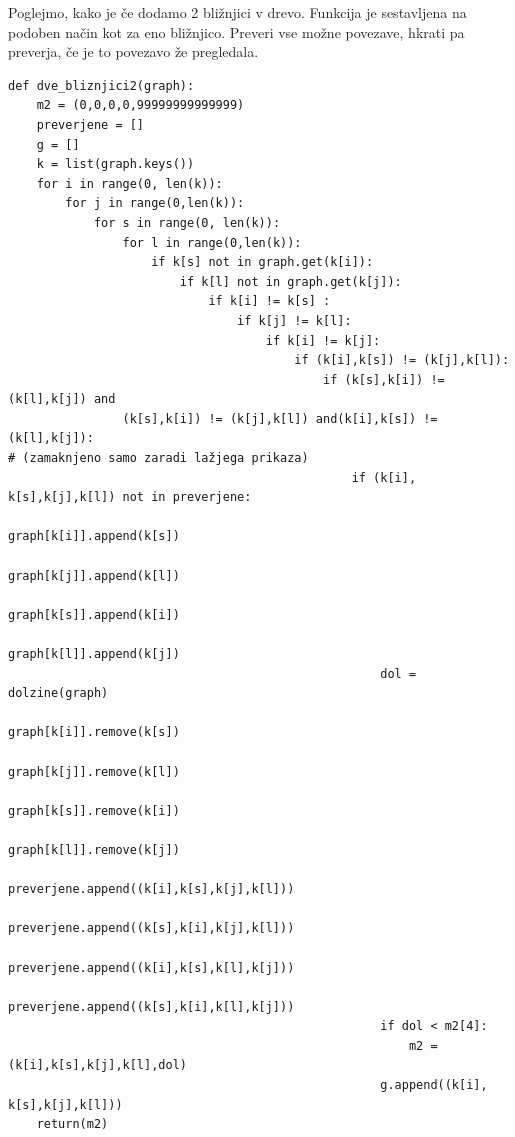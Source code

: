 \documentclass[a4paper,10pt]{article}
\begin{document}
Poglejmo, kako je če dodamo 2 bližnjici v drevo. Funkcija je sestavljena na podoben način kot za eno bližnjico. Preveri vse možne povezave, hkrati pa preverja, če je to povezavo že pregledala. 
\small
\begin{verbatim}
def dve_bliznjici2(graph):
    m2 = (0,0,0,0,99999999999999)
    preverjene = []
    g = []
    k = list(graph.keys())
    for i in range(0, len(k)):
        for j in range(0,len(k)):
            for s in range(0, len(k)):
                for l in range(0,len(k)):
                    if k[s] not in graph.get(k[i]):
                        if k[l] not in graph.get(k[j]):
                            if k[i] != k[s] :
                                if k[j] != k[l]:
                                    if k[i] != k[j]:
                                        if (k[i],k[s]) != (k[j],k[l]):
                                            if (k[s],k[i]) != (k[l],k[j]) and 
				(k[s],k[i]) != (k[j],k[l]) and(k[i],k[s]) != (k[l],k[j]):
# (zamaknjeno samo zaradi lažjega prikaza)
                                                if (k[i], k[s],k[j],k[l]) not in preverjene:
                                                    graph[k[i]].append(k[s])
                                                    graph[k[j]].append(k[l])
                                                    graph[k[s]].append(k[i])
                                                    graph[k[l]].append(k[j])
                                                    dol = dolzine(graph)
                                                    graph[k[i]].remove(k[s])
                                                    graph[k[j]].remove(k[l])
                                                    graph[k[s]].remove(k[i])
                                                    graph[k[l]].remove(k[j])
                                                    preverjene.append((k[i],k[s],k[j],k[l]))
                                                    preverjene.append((k[s],k[i],k[j],k[l]))
                                                    preverjene.append((k[i],k[s],k[l],k[j]))
                                                    preverjene.append((k[s],k[i],k[l],k[j]))
                                                    if dol < m2[4]:
                                                        m2 = (k[i],k[s],k[j],k[l],dol)
                                                    g.append((k[i], k[s],k[j],k[l]))
    return(m2)
\end{verbatim}
\normalsize
\end{document}

